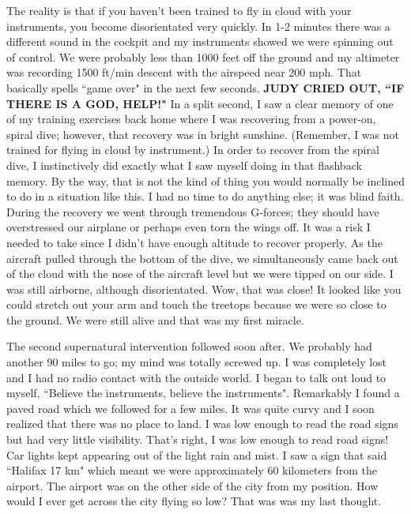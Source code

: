 \documentclass[oneside,12pt]{book}
\begin{document}
The reality is that if you haven't been trained to fly in cloud with your instruments, you become disorientated very quickly. In 1-2 minutes there was a different sound in the cockpit and my instruments showed we were spinning out of control. We were probably less than 1000 feet off the ground and my altimeter was recording 1500 ft/min descent with the airspeed near 200 mph. That basically spells ``game over" in the next few seconds. \textbf{JUDY CRIED OUT, ``IF THERE IS A GOD, HELP!"} In a split second, I saw a clear memory of one of my training exercises back home where I was recovering from a power-on, spiral dive; however, that recovery was in bright sunshine. (Remember, I was not trained for flying in cloud by instrument.) In order to recover from the spiral dive, I instinctively did exactly what I saw myself doing in that flashback memory. By the way, that is not the kind of thing you would normally be inclined to do in a situation like this. I had no time to do anything else; it was blind faith. During the recovery we went through tremendous G-forces; they should have overstressed our airplane or perhaps even torn the wings off. It was a risk I needed to take since I didn't have enough altitude to recover properly. As the aircraft pulled through the bottom of the dive, we simultaneously came back out of the cloud with the nose of the aircraft level but we were tipped on our side. I was still airborne, although disorientated. Wow, that was close! It looked like you could stretch out your arm and touch the treetops because we were so close to the ground. We were still alive and that was my first miracle. 

The second supernatural intervention followed soon after. We probably had another 90 miles to go; my mind was totally screwed up. I was completely lost and I had no radio contact with the outside world. I began to talk out loud to myself, ``Believe the instruments, believe the instruments". Remarkably I found a paved road which we followed for a few miles. It was quite curvy and I soon realized that there was no place to land. I was low enough to read the road signs but had very little visibility. That's right, I was low enough to read road signs! Car lights kept appearing out of the light rain and mist. I saw a sign that said ``Halifax 17 km" which meant we were approximately 60 kilometers from the airport. The airport was on the other side of the city from my position. How would I ever get across the city flying so low? That was was my last thought. 
\end{document}

